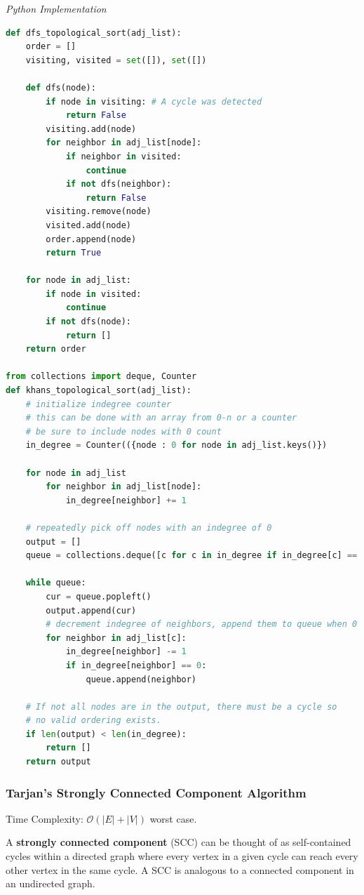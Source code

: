 \documentclass{article}
\newcommand{\bigO}{\mathcal{O}}
\begin{document}
\vspace{8pt} \emph{Python Implementation}
\begin{lstlisting}[language=Python]
def dfs_topological_sort(adj_list):
    order = []
    visiting, visited = set([]), set([])
    
    def dfs(node):
        if node in visiting: # A cycle was detected
            return False
        visiting.add(node)
        for neighbor in adj_list[node]:
            if neighbor in visited:
                continue
            if not dfs(neighbor):
                return False
        visiting.remove(node)
        visited.add(node)
        order.append(node)
        return True

    for node in adj_list:
        if node in visited:
            continue
        if not dfs(node):
            return []
    return order
    
from collections import deque, Counter
def khans_topological_sort(adj_list):
    # initialize indegree counter
    # this can be done with an array from 0-n or a counter
    # be sure to include nodes with 0 count
    in_degree = Counter(({node : 0 for node in adj_list.keys()})
    
    for node in adj_list
        for neighbor in adj_list[node]:
            in_degree[neighbor] += 1
            
    # repeatedly pick off nodes with an indegree of 0 
    output = []
    queue = collections.deque([c for c in in_degree if in_degree[c] == 0])
    
    while queue:
        cur = queue.popleft()
        output.append(cur)
        # decrement indegree of neighbors, append them to queue when 0
        for neighbor in adj_list[c]:
            in_degree[neighbor] -= 1
            if in_degree[neighbor] == 0:
                queue.append(neighbor)
                
    # If not all nodes are in the output, there must be a cycle so
    # no valid ordering exists.
    if len(output) < len(in_degree):
        return []
    return output 
\end{lstlisting}
    
    \subsubsection{Tarjan's Strongly Connected Component Algorithm}
    Time Complexity: $\bigO (|E| + |V|)$ worst case.
    
    A \textbf{strongly connected component} (SCC) can be thought of as self-contained cycles within a directed graph where every vertex in a given cycle can reach every other vertex in the same cycle. A SCC is analogous to a connected component in an undirected graph.
    
\end{document}
